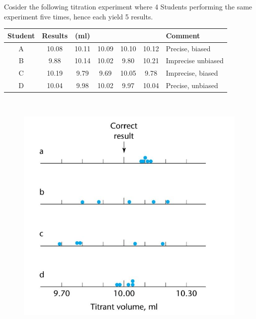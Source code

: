 \documentclass[12pt, a4paper]{article}
\begin{document}
	Cosider the following titration experiment where 4 Students performing the same experiment five times, hence each yield 5 results. \vspace{0.5cm}
	{
		\large
	\begin{tabular}{|c|ccccc|l|}
		\hline
		Student & Results  & (ml) &  &  &  & Comment \\ \hline
		A & 10.08 & 10.11 &10.09 &10.10&10.12 & Precise, biased\\ \hline
		B & 9.88 &10.14& 10.02 &9.80& 10.21& Imprecise unbiased\\ \hline
		C & 10.19 &9.79& 9.69 &10.05& 9.78 & Imprecise, biased\\ \hline
		D & 10.04 &9.98 &10.02 &9.97 &10.04 & Precise, unbiased \\
		\hline
	\end{tabular}\\
	
}

\begin{figure}[h!]
\centering
\includegraphics[width=0.8\linewidth]{Titra2}
\end{figure}
\newpage
\end{document}

